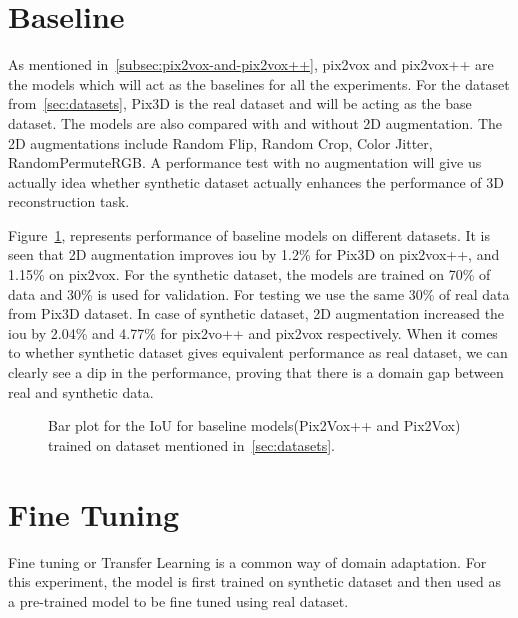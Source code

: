 \section{Baseline}\label{sec:baseline}

As mentioned in~\ref{subsec:pix2vox-and-pix2vox++}, pix2vox and pix2vox++ are the models which will act as the baselines for all the experiments.
For the dataset from~\ref{sec:datasets}, Pix3D is the real dataset and will be acting as the base dataset.
The models are also compared with and without 2D augmentation.
The 2D augmentations include Random Flip, Random Crop, Color Jitter, RandomPermuteRGB.
A performance test with no augmentation will give us actually idea whether synthetic dataset actually enhances the performance of 3D reconstruction task.

Figure~\ref{fig:baseline1}, represents performance of baseline models on different datasets.
It is seen that 2D augmentation improves \gls{iou}  by 1.2\% for Pix3D on pix2vox++, and 1.15\% on pix2vox.
For the synthetic dataset, the models are trained on 70\% of data and 30\% is used for validation.
For testing we use the same 30\% of real data from Pix3D dataset.
In case of synthetic dataset, 2D augmentation increased the \gls{iou}  by 2.04\% and 4.77\%  for pix2vo++ and pix2vox respectively.
When it comes to whether synthetic dataset gives equivalent performance as real dataset, we can clearly see a dip in the performance,
proving that there is a domain gap between real and synthetic data.

\begin{figure}
    \centering
    \resizebox{\textwidth}{!}{}
    \caption{Bar plot for the IoU for baseline models(Pix2Vox++ and Pix2Vox) trained on dataset mentioned in~\ref{sec:datasets}. }
    \label{fig:baseline1}
\end{figure}


\section{Fine Tuning}\label{sec:fine-tuning}
Fine tuning or Transfer Learning is a common way of domain adaptation.
For this experiment, the model is first trained on synthetic dataset and then used as a pre-trained model to be fine tuned using real dataset.

